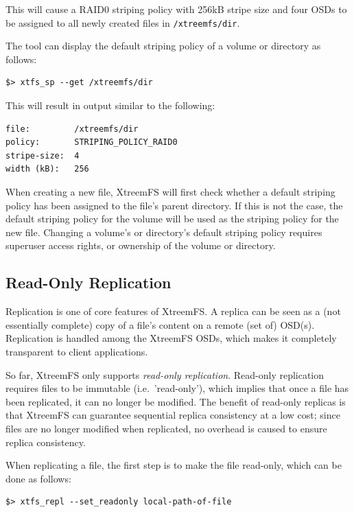 \documentclass[a4paper,10pt]{book}
\begin{document}
This will cause a RAID0 striping policy with 256kB stripe size and four OSDs to be assigned to all newly created files in \texttt{/xtreemfs/dir}.

The tool can display the default striping policy of a volume or directory as follows:

\begin{verbatim}
$> xtfs_sp --get /xtreemfs/dir
\end{verbatim}

This will result in output similar to the following:

\begin{verbatim}
file:         /xtreemfs/dir
policy:       STRIPING_POLICY_RAID0
stripe-size:  4
width (kB):   256
\end{verbatim}

When creating a new file, XtreemFS will first check whether a default striping policy has been assigned to the file's parent directory. If this is not the case, the default striping policy for the volume will be used as the striping policy for the new file. Changing a volume's or directory's default striping policy requires superuser access rights, or ownership of the volume or directory.


\subsection{Read-Only Replication}
\label{sec:roreplication}

Replication is one of core features of XtreemFS. A replica can be seen as a (not essentially complete) copy of a file's content on a remote (set of) OSD(s). Replication is handled among the XtreemFS OSDs, which makes it completely transparent to client applications.

So far, XtreemFS only supports \emph{read-only replication}. Read-only replication requires files to be immutable (i.e.\ 'read-only'), which implies that once a file has been replicated, it can no longer be modified. The benefit of read-only replicas is that XtreemFS can guarantee sequential replica consistency at a low cost; since files are no longer modified when replicated, no overhead is caused to ensure replica consistency.

When replicating a file, the first step is to make the file read-only, which can be done as follows:

\begin{verbatim}
$> xtfs_repl --set_readonly local-path-of-file
\end{verbatim}
\end{document}
